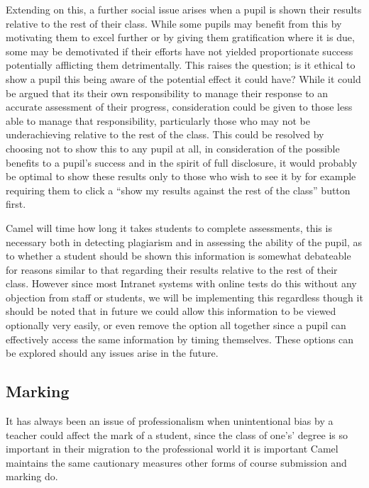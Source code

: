     Extending on this, a further social issue arises when a pupil is shown their results relative to the rest of their class. While some pupils may benefit from this by motivating them to excel further or by giving them gratification where it is due, some may be demotivated if their efforts have not yielded proportionate success potentially afflicting them detrimentally. This raises the question; is it ethical to show a pupil this being aware of the potential effect it could have? While it could be argued that its their own responsibility to manage their response to an accurate assessment of their progress, consideration could be given to those less able to manage that responsibility, particularly those who may not be underachieving relative to the rest of the class. This could be resolved by choosing not to show this to any pupil at all, in consideration of the possible benefits to a pupil’s success and in the spirit of full disclosure, it would probably be optimal to show these results only to those who wish to see it by for example requiring them to click a “show my results against the rest of the class” button first.

    Camel will time how long it takes students to complete assessments, this is necessary both in detecting plagiarism and in assessing the ability of the pupil, as to whether a student should be shown this information is somewhat debateable for reasons similar to that regarding their results relative to the rest of their class. However since most Intranet systems with online tests do this without any objection from staff or students, we will be implementing this regardless though it should be noted that in future we could allow this information to be viewed optionally very easily, or even remove the option all together since a pupil can effectively access the same information by timing themselves. These options can be explored should any issues arise in the future.

    \subsection*{Marking}
    It has always been an issue of professionalism when unintentional bias by a teacher could affect the mark of a student, since the class of one's’ degree is so important in their migration to the professional world it is important Camel maintains the same cautionary measures other forms of course submission and marking do.

